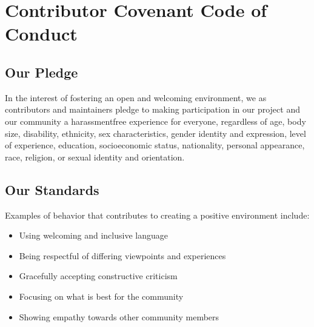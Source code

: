 \documentclass[letterpaper,10pt,english]{sphinxmanual}
\begin{document}
\chapter{Contributor Covenant Code of Conduct}
\label{\detokenize{Code-of-conduct:contributor-covenant-code-of-conduct}}\label{\detokenize{Code-of-conduct:code-of-conduct}}\label{\detokenize{Code-of-conduct::doc}}

\section{Our Pledge}
\label{\detokenize{Code-of-conduct:our-pledge}}
\sphinxAtStartPar
In the interest of fostering an open and welcoming environment, we as
contributors and maintainers pledge to making participation in our project and
our community a harassment\sphinxhyphen{}free experience for everyone, regardless of age, body
size, disability, ethnicity, sex characteristics, gender identity and
expression, level of experience, education, socio\sphinxhyphen{}economic status, nationality,
personal appearance, race, religion, or sexual identity and orientation.


\section{Our Standards}
\label{\detokenize{Code-of-conduct:our-standards}}
\sphinxAtStartPar
Examples of behavior that contributes to creating a positive environment
include:
\begin{itemize}
\item {} 
\sphinxAtStartPar
Using welcoming and inclusive language

\item {} 
\sphinxAtStartPar
Being respectful of differing viewpoints and experiences

\item {} 
\sphinxAtStartPar
Gracefully accepting constructive criticism

\item {} 
\sphinxAtStartPar
Focusing on what is best for the community

\item {} 
\sphinxAtStartPar
Showing empathy towards other community members

\end{itemize}
\end{document}
